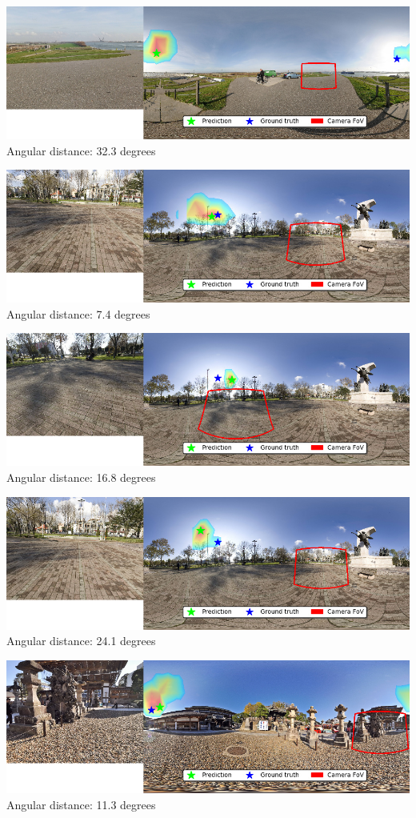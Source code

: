\begin{multicols}{2}
\includegraphics[width=\mywidth]{pano_aaqezlelvvcrrh_006.jpg}\\
Angular distance: 32.3 degrees

\includegraphics[width=\mywidth]{pano_aaqhsrljfiqght_005.jpg}\\
Angular distance: 7.4 degrees

\includegraphics[width=\mywidth]{pano_aaqhsrljfiqght_002.jpg}\\
Angular distance: 16.8 degrees

\includegraphics[width=\mywidth]{pano_aaqhsrljfiqght_003.jpg}\\
Angular distance: 24.1 degrees

\includegraphics[width=\mywidth]{pano_aaqpmaoqocdqfu_007.jpg}\\
Angular distance: 11.3 degrees


\end{multicols}
